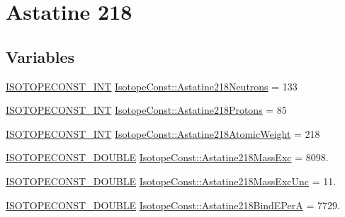 \hypertarget{group___isotope_const-_astatine-_at218}{}\section{Astatine 218}
\label{group___isotope_const-_astatine-_at218}
\subsection*{Variables}
\begin{DoxyCompactItemize}
\item 
\mbox{\hyperlink{group___isotope_const-_macros_ga5f18360b3e99483a35c32d789e62621c}{I\+S\+O\+T\+O\+P\+E\+C\+O\+N\+S\+T\+\_\+\+I\+NT}} \mbox{\hyperlink{group___isotope_const-_astatine-_at218_gabe3dfccfe439c95866b018c59c39d19e}{Isotope\+Const\+::\+Astatine218\+Neutrons}} = 133
\item 
\mbox{\hyperlink{group___isotope_const-_macros_ga5f18360b3e99483a35c32d789e62621c}{I\+S\+O\+T\+O\+P\+E\+C\+O\+N\+S\+T\+\_\+\+I\+NT}} \mbox{\hyperlink{group___isotope_const-_astatine-_at218_ga4a7126772c78666dcb5000b5777b4bb6}{Isotope\+Const\+::\+Astatine218\+Protons}} = 85
\item 
\mbox{\hyperlink{group___isotope_const-_macros_ga5f18360b3e99483a35c32d789e62621c}{I\+S\+O\+T\+O\+P\+E\+C\+O\+N\+S\+T\+\_\+\+I\+NT}} \mbox{\hyperlink{group___isotope_const-_astatine-_at218_ga4b0c1763ce44fc10819ae51dc417a250}{Isotope\+Const\+::\+Astatine218\+Atomic\+Weight}} = 218
\item 
\mbox{\hyperlink{group___isotope_const-_macros_ga8f45a7272ce02c0b4c65c44636ed719a}{I\+S\+O\+T\+O\+P\+E\+C\+O\+N\+S\+T\+\_\+\+D\+O\+U\+B\+LE}} \mbox{\hyperlink{group___isotope_const-_astatine-_at218_ga8fc9945d33ccda3f33222856645abfaf}{Isotope\+Const\+::\+Astatine218\+Mass\+Exc}} = 8098.
\item 
\mbox{\hyperlink{group___isotope_const-_macros_ga8f45a7272ce02c0b4c65c44636ed719a}{I\+S\+O\+T\+O\+P\+E\+C\+O\+N\+S\+T\+\_\+\+D\+O\+U\+B\+LE}} \mbox{\hyperlink{group___isotope_const-_astatine-_at218_gac8089e3d198fbbcdcf50284b07d26a70}{Isotope\+Const\+::\+Astatine218\+Mass\+Exc\+Unc}} = 11.
\item 
\mbox{\hyperlink{group___isotope_const-_macros_ga8f45a7272ce02c0b4c65c44636ed719a}{I\+S\+O\+T\+O\+P\+E\+C\+O\+N\+S\+T\+\_\+\+D\+O\+U\+B\+LE}} \mbox{\hyperlink{group___isotope_const-_astatine-_at218_gaff2a1c539cde7c67ae74e17564ac9131}{Isotope\+Const\+::\+Astatine218\+Bind\+E\+PerA}} = 7729.
\item 

\end{DoxyCompactItemize}
